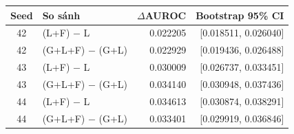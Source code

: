 \small
\begin{tabular}{clrr}
\toprule
Seed & So sánh & $\Delta$AUROC & Bootstrap 95\% CI \\
\midrule
42 & (L+F) $-$ L & 0.022205 & [0.018511, 0.026040] \\
42 & (G+L+F) $-$ (G+L) & 0.022929 & [0.019436, 0.026488] \\
43 & (L+F) $-$ L & 0.030009 & [0.026737, 0.033451] \\
43 & (G+L+F) $-$ (G+L) & 0.034140 & [0.030948, 0.037436] \\
44 & (L+F) $-$ L & 0.034613 & [0.030874, 0.038291] \\
44 & (G+L+F) $-$ (G+L) & 0.033401 & [0.029919, 0.036846] \\
\bottomrule
\end{tabular}
